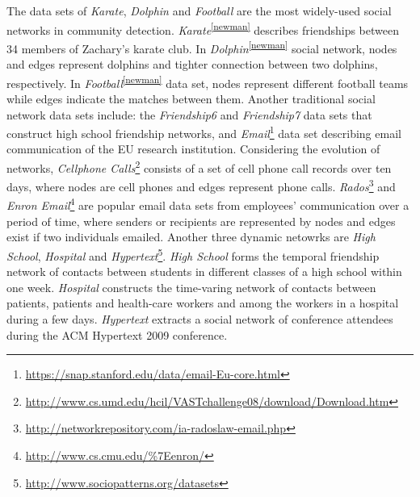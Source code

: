 The data sets of \textit{Karate}, \textit{Dolphin} and \textit{Football} are the most widely-used social networks in community detection. \textit{Karate}\textsuperscript{\ref{newman}} describes friendships between 34 members of Zachary’s karate club. In \textit{Dolphin}\textsuperscript{\ref{newman}} social network, nodes and edges represent dolphins and tighter connection between two dolphins, respectively. In \textit{Football}\textsuperscript{\ref{newman}} data set, nodes represent different football teams while edges indicate the matches between them. Another traditional social network data sets include: the \textit{Friendship6} and \textit{Friendship7} data sets that construct high school friendship networks, and \textit{Email}\footnote{\url{https://snap.stanford.edu/data/email-Eu-core.html}} data set describing email communication of the EU research institution. Considering the evolution of networks, \textit{Cellphone Calls}\footnote{\url{http://www.cs.umd.edu/hcil/VASTchallenge08/download/Download.htm}} consists of a set of cell phone call records over ten days, where nodes are cell phones and edges represent phone calls. \textit{Rados}\footnote{\url{http://networkrepository.com/ia-radoslaw-email.php}} and \textit{Enron Email}\footnote{\url{http://www.cs.cmu.edu/\%7Eenron/}} are popular email data sets from employees' communication over a period of time, where senders or recipients are represented by nodes and edges exist if two individuals emailed. Another three dynamic netowrks are \textit{High School}, \textit{Hospital} 
and \textit{Hypertext}\footnote{\url{http://www.sociopatterns.org/datasets}}. \textit{High School} forms the temporal friendship network of contacts between students in different classes of a high school within one week. \textit{Hospital} constructs the time-varing network of contacts between patients, patients and health-care workers and among the workers in a hospital during a few days. \textit{Hypertext} extracts a social network of conference attendees during the ACM Hypertext 2009 conference.
